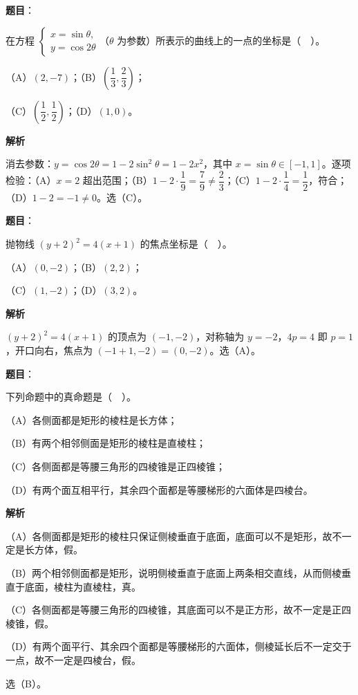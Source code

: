 \begin{answer}

\textbf{题目}：

在方程 $\begin{cases}x=\sin\theta,\\ y=\cos 2\theta\end{cases}$（$\theta$ 为参数）所表示的曲线上的一点的坐标是（　）。

（A）$(2,-7)$；（B）$\left(\dfrac{1}{3},\dfrac{2}{3}\right)$；

（C）$\left(\dfrac{1}{2},\dfrac{1}{2}\right)$；（D）$(1,0)$。

\textbf{解析}

消去参数：$y=\cos 2\theta=1-2\sin^{2}\theta=1-2x^{2}$，其中 $x=\sin\theta\in[-1,1]$。逐项检验：（A）$x=2$ 超出范围；（B）$1-2\cdot\dfrac{1}{9}=\dfrac{7}{9}\ne\dfrac{2}{3}$；（C）$1-2\cdot\dfrac{1}{4}=\dfrac{1}{2}$，符合；（D）$1-2=-1\ne 0$。选（C）。


\end{answer}
\begin{answer}

\textbf{题目}：

抛物线 $(y+2)^{2}=4(x+1)$ 的焦点坐标是（　）。

（A）$(0,-2)$；（B）$(2,2)$；

（C）$(1,-2)$；（D）$(3,2)$。

\textbf{解析}

$(y+2)^{2}=4(x+1)$ 的顶点为 $(-1,-2)$，对称轴为 $y=-2$，$4p=4$ 即 $p=1$，开口向右，焦点为 $(-1+1,-2)=(0,-2)$。选（A）。


\end{answer}
\begin{answer}

\textbf{题目}：

下列命题中的真命题是（　）。

（A）各侧面都是矩形的棱柱是长方体；

（B）有两个相邻侧面是矩形的棱柱是直棱柱；

（C）各侧面都是等腰三角形的四棱锥是正四棱锥；

（D）有两个面互相平行，其余四个面都是等腰梯形的六面体是四棱台。

\textbf{解析}

（A）各侧面都是矩形的棱柱只保证侧棱垂直于底面，底面可以不是矩形，故不一定是长方体，假。

（B）两个相邻侧面都是矩形，说明侧棱垂直于底面上两条相交直线，从而侧棱垂直于底面，棱柱为直棱柱，真。

（C）各侧面都是等腰三角形的四棱锥，其底面可以不是正方形，故不一定是正四棱锥，假。

（D）有两个面平行、其余四个面都是等腰梯形的六面体，侧棱延长后不一定交于一点，故不一定是四棱台，假。

选（B）。


\end{answer}
